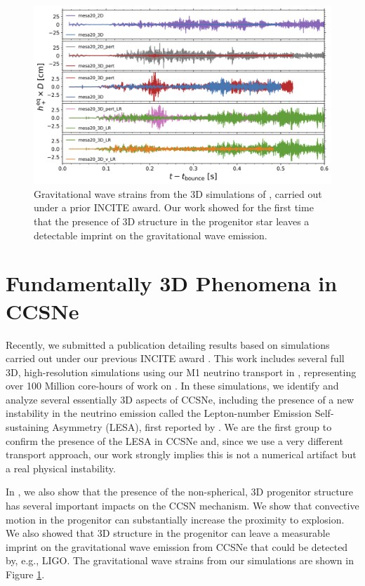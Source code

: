 \documentclass[12pt]{article}
\begin{document}
\begin{figure}
  \includegraphics[width=6in]{./gw_trains.png}
  \caption{Gravitational wave strains from the 3D simulations of \citet{oconnor:2018}, carried out under a prior INCITE award. Our work showed for the first time that the presence of 3D structure in the progenitor star leaves a detectable imprint on the gravitational wave emission.}
  \label{f.strains}
\end{figure}

\section{Fundamentally 3D Phenomena in CCSNe}

Recently, we submitted a publication detailing results based on simulations carried out under our previous INCITE award \citep{oconnor:2018b}.
This work includes several full 3D, high-resolution simulations using our M1 neutrino transport in \flash, representing over 100 Million core-hours of work on \mira.
In these simulations, we identify and analyze several essentially 3D aspects of CCSNe, including the presence of a new instability in the neutrino emission called the Lepton-number Emission Self-sustaining Asymmetry (LESA), first reported by \citep{tamborra:2014}. 
We are the first group to confirm the presence of the LESA in CCSNe and, since we use a very different transport approach, our work strongly implies this is not a numerical artifact but a real physical instability. 

In \citet{oconnor:2018}, we also show that the presence of the non-spherical, 3D progenitor structure has several important impacts on the CCSN mechanism. 
We show that convective motion in the progenitor can substantially increase the proximity to explosion.
We also showed that 3D structure in the progenitor can leave a measurable imprint on the gravitational wave emission from CCSNe that could be detected by, e.g., LIGO. 
The gravitational wave strains from our simulations are shown in Figure \ref{f.strains}.
\end{document}
